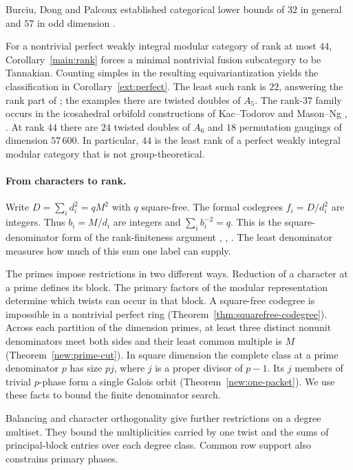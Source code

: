 \documentclass[11pt]{amsart}
\numberwithin{equation}{section}
\theoremstyle{definition}
\theoremstyle{plain}
\begin{document}
Burciu, Dong and Palcoux established categorical lower bounds of $32$ in general and $57$ in odd dimension \cite[Theorem~22.2]{BDPcore}.

For a nontrivial perfect weakly integral modular category of rank at
most $44$, Corollary~\ref{main:rank} forces a minimal nontrivial
fusion subcategory to be Tannakian. Counting simples in the resulting
equivariantization yields the classification in Corollary~\ref{ext:perfect}.
The least such rank is $22$, answering the rank part of
\cite[Question~11.8]{BPBurnside}; the examples there are twisted doubles
of $A_5$. The rank-$37$ family occurs in the icosahedral orbifold
constructions of Kac--Todorov and Mason--Ng
\cite[\S6B]{KacTodorov}, \cite[\S4, Example~3]{MasonNgOrbifolds}.
At rank $44$ there are $24$ twisted doubles of $A_6$ and $18$
permutation gaugings of dimension $57\,600$. In particular, $44$ is
the least rank of a perfect weakly integral modular category that is
not group-theoretical.

\paragraph{From characters to rank.}
Write $D=\sum_i d_i^2=qM^2$ with $q$ square-free. The formal codegrees
$f_i=D/d_i^2$ are integers. Thus $b_i=M/d_i$ are integers and
$\sum_i b_i^{-2}=q$. This is the square-denominator form of the rank-finiteness argument
\cite[Proposition~8.38]{ENOannals}, \cite[Lemma~2.3]{HR}, \cite[\S4]{ABPP}.
The least denominator measures how much of this sum one label can supply.

The primes impose restrictions in two different ways. Reduction of a character at a prime defines its block. The primary factors of the modular representation determine which twists can occur in that block. A square-free codegree is impossible in a nontrivial perfect ring (Theorem~\ref{thm:squarefree-codegree}). Across each partition of the dimension primes, at least three distinct nonunit denominators meet both sides and their least common multiple is $M$ (Theorem~\ref{new:prime-cut}). In square dimension the complete class at a prime denominator $p$ has size $pj$, where $j$ is a proper divisor of $p-1$. Its $j$ members of trivial $p$-phase form a single Galois orbit (Theorem~\ref{new:one-packet}). We use these facts to bound the finite denominator search.

Balancing and character orthogonality give further restrictions on a
degree multiset. They bound the multiplicities carried by one twist and
the sums of principal-block entries over each degree class. Common row
support also constrains primary phases.
\end{document}

